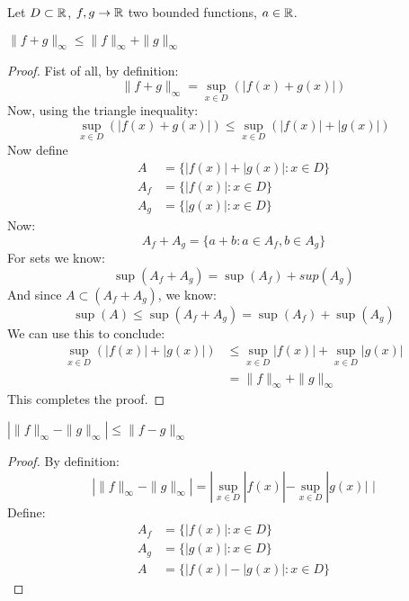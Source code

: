 \documentclass[week=5]{homework}
\begin{document}
\begin{questions}
\begin{parts}
			So $f_n(x_0) \to f^*$ pointwise $\forall x \in [0, \pi]$. 
			
			\part $f_n : [0,\infty) \to \reals$ with $f_n(x) = \frac{x}{n} \exp \left(- \frac{x}{n} \right)$
			
			Define 
			\[
				f^*(x) = 0 \quad \forall_{x \in [0,\infty)}
			\]
			Now:
			\[
				f_n(x) = \frac{x}{n} e^{-\frac{x}{n}} = \frac{\frac{x}{n}}{e^{\frac{x}{n}}} \to 0 \text{ as } n to \infty
			\]
			Therefore, $f_n(x) \to f^*(x)$ pointwise. 
			
		\end{parts}

		\question
		Let $D \subset \mathbb{R}$, $f, g \to \mathbb{R}$ two bounded functions, $a \in \mathbb{R}$. 
		
		\begin{toprove}
			$\|f+g\|_\infty \le \|f\|_\infty + \|g\|_\infty$
		\end{toprove}
		\begin{proof}
			Fist of all, by definition: 
			\[
				\| f + g \|_\infty = \sup_{x \in D} ( |f(x) + g(x)| )
			\]
			Now, using the triangle inequality:
			\[
				\sup_{x \in D} ( |f(x) + g(x)| ) \le \sup_{x \in D} ( |f(x)| + |g(x)| )
			\]
			Now define 
			\begin{align}
				A &= \{|f(x)| + |g(x)|:  x \in D \} \\
				A_f &= \{|f(x)|: x \in D \} \\
				A_g &= \{|g(x)|: x \in D \}
			\end{align}
			Now: 
			\[
				A_f + A_g = \{a + b : a \in A_f, b \in A_g \}
			\]
			For sets we know: 
			\[
				\sup(A_f + A_g) = \sup(A_f) + sup(A_g)
			\]
			And since $A \subset (A_f + A_g)$, we know:
			\[
				\sup(A) \le \sup(A_f + A_g) = \sup(A_f) + \sup(A_g)
			\]
			We can use this to conclude:
			\begin{align*}
				\sup_{x \in D} ( |f(x)| + |g(x)| ) &\le \sup_{x \in D} |f(x)| + \sup_{x \in D} |g(x)| \\
				&= \|f \|_\infty + \| g \|_\infty
			\end{align*}
			This completes the proof. 
		\end{proof}
		
		\begin{toprove}
			$\left| \|f\|_\infty - \|g\|_\infty \right| \le \|f-g\|_\infty$
		\end{toprove}
		\begin{proof}
			By definition:
			\[
				\left| \|f\|_\infty - \|g\|_\infty \right| = | \sup_{x \in D} |f(x)| - \sup_{x \in D} |g(x)| \, \, |	
			\]
			Define:
			\begin{align*}
				A_f &= \{|f(x)| : x \in D \} \\
				A_g &= \{|g(x)| : x \in D \} \\
				A &= \{|f(x)| - |g(x)| : x \in D \}
			\end{align*}
			

\end{proof}
\end{questions}
\end{document}
